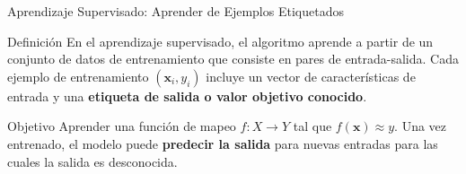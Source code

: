 \documentclass[aspectratio=169,xcolor=dvipsnames]{beamer}
\begin{document}
\begin{frame}{Aprendizaje Supervisado: Aprender de Ejemplos Etiquetados}
    \begin{block}{Definición}
    En el aprendizaje supervisado, el algoritmo aprende a partir de un conjunto de datos de entrenamiento que consiste en pares de entrada-salida. Cada ejemplo de entrenamiento $(\mathbf{x}_i, y_i)$ incluye un vector de características de entrada y una \textbf{etiqueta de salida o valor objetivo conocido}.
    \end{block}
    
    \begin{alertblock}{Objetivo}
    Aprender una función de mapeo $f: X \to Y$ tal que $f(\mathbf{x}) \approx y$. Una vez entrenado, el modelo puede \textbf{predecir la salida} para nuevas entradas para las cuales la salida es desconocida.
    \end{alertblock}
\end{frame}

\end{document}
